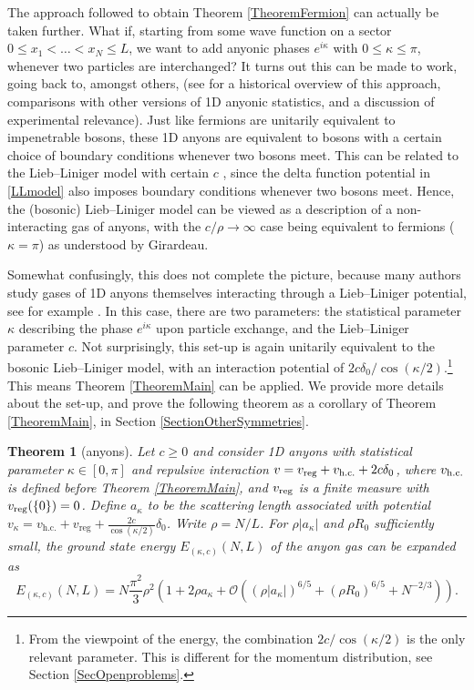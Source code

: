 \documentclass[a4paper,11pt]{article}
\newtheorem{theorem}{Theorem}
\numberwithin{equation}{section}
\begin{document}
	The approach followed to obtain Theorem \ref{TheoremFermion} can actually be taken further. What if, starting from some wave function on a sector $0\leq x_1<\dots<x_N\leq L$, we want to add anyonic phases $e^{i\kappa}$ with $0\leq \kappa\leq\pi$, whenever two particles are interchanged? It turns out this can be made to work, going back to, amongst others,  \cite{leinaas1977theory,kundu1999exact} (see \cite{posske2017second,bonkhoff2021bosonic} for a historical overview of this approach, comparisons with other versions of 1D anyonic statistics, and a discussion of experimental relevance). Just like fermions are unitarily equivalent to impenetrable bosons, these 1D anyons are equivalent to bosons with a certain choice of boundary conditions whenever two bosons meet. This can be related to the Lieb--Liniger model with certain $c$ \cite{posske2017second}, since the delta function potential in \eqref{LLmodel} also imposes boundary conditions whenever two bosons meet. Hence, the (bosonic) Lieb--Liniger model can be viewed as a description of a non-interacting gas of anyons, with the $c/\rho\to\infty$ case being equivalent to fermions ($\kappa=\pi$) as understood by Girardeau. 
	
	Somewhat confusingly, this does not complete the picture, because many authors study gases of 1D anyons themselves interacting through a Lieb--Liniger potential, see for example \cite{batchelor2006one,hao2008ground}. In this case, there are two parameters: the statistical parameter $\kappa$ describing the phase $e^{i\kappa}$ upon particle exchange, and the Lieb--Liniger parameter $c$. Not surprisingly, this set-up is again unitarily equivalent to the bosonic Lieb--Liniger model, with an interaction potential of $2c\delta_0/\cos(\kappa/2)$.\footnote{From the viewpoint of the energy, the combination $2c/\cos(\kappa/2)$ is the only relevant parameter. This is different for the momentum distribution, see Section \ref{SecOpenproblems}.} This means Theorem \ref{TheoremMain} can be applied. We provide more details about the set-up, and prove the following theorem as a corollary of Theorem \ref{TheoremMain}, in Section \ref{SectionOtherSymmetries}.
	
	
	
	\begin{theorem}[anyons]
		\label{TheoremAnyon}
		Let $c\geq0$ and consider 1D anyons with statistical parameter $\kappa\in[0,\pi]$ and repulsive interaction $v=v_{\textnormal{reg}}+v_{\textnormal{h.c.}}+2c\delta_0$, where $v_{\textnormal{h.c.}}$ is defined before Theorem \ref{TheoremMain}, and $v_{\textnormal{reg}}$ is a finite measure with $v_{\textnormal{reg}}(\{0\})=0$.
		Define $a_\kappa$ to be the scattering length associated with potential $ v_\kappa=v_{\text{h.c.}}+v_{\text{reg}}+\frac{2c}{\cos(\kappa/2)}\delta_0 $.
		Write $\rho=N/L$. For $\rho|a_\kappa|$ and $\rho R_0$ sufficiently small, the ground state energy $E_{(\kappa,c)}(N,L)$ of the anyon gas can be expanded as
		\begin{equation}
			E_{(\kappa,c)}(N,L)=N\frac{\pi^2}{3}\rho^2\left(1+2\rho a_{\kappa}+\mathcal{O}
			\left((\rho|a_\kappa|)^{6/5}+(\rho R_0)^{6/5}+N^{-2/3}\right)\right).
		\end{equation}
	\end{theorem}
	
\end{document}
